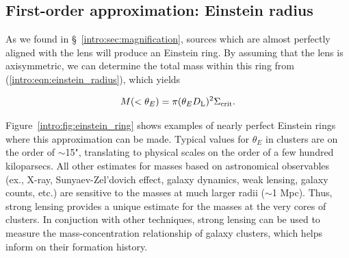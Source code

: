 \subsection{First-order approximation: Einstein radius}

As we found in \S~\ref{intro:sec:magnification}, sources which are almost perfectly aligned with the lens will produce an Einstein ring. By assuming that the lens is axisymmetric, we can determine the total mass within this ring from (\ref{intro:eqn:einstein_radius}), which yields

\begin{equation}
M(<\theta_E) = \pi (\theta_E D_\mathrm{L})^2 \Sigma_\mathrm{crit}.
\label{intro:eqn:einstein_mass}
\end{equation}

Figure~\ref{intro:fig:einstein_ring} shows examples of nearly perfect Einstein rings where this approximation can be made. Typical values for $\theta_E$ in clusters are on the order of $\sim$15", translating to physical scales on the order of a few hundred kiloparsecs. All other estimates for masses based on astronomical observables (ex., X-ray, Sunyaev-Zel'dovich effect, galaxy dynamics, weak lensing, galaxy counts, etc.) are sensitive to the masses at much larger radii ($\sim$1 Mpc). Thus, strong lensing provides a unique estimate for the masses at the very cores of clusters. In conjuction with other techniques, strong lensing can be used to measure the mass-concentration relationship of galaxy clusters, which helps inform on their formation history.

